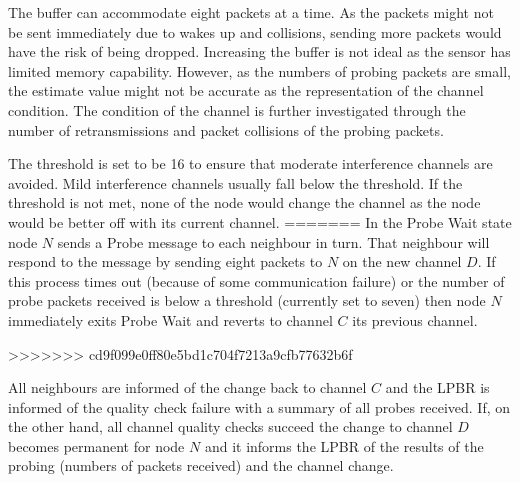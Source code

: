 The buffer can accommodate eight packets at a time. As the packets might not be sent immediately due to wakes up and collisions, sending more packets would have the risk of being dropped. Increasing the buffer is not ideal as the sensor has limited memory capability. However, as the numbers of probing packets are small, the estimate value might not be accurate as the representation of the channel condition. The condition of the channel is further investigated through the number of retransmissions and packet collisions of the probing packets. 

The threshold is set to be 16 to ensure that moderate interference channels are avoided. Mild interference channels usually fall below the threshold. If the threshold is not met, none of the node would change the channel as the node would be better off with its current channel. 
=======
In the Probe Wait state node $N$ sends a Probe message to each neighbour in turn. That neighbour will respond to the message by sending eight packets to $N$ on the new channel $D$. If this process times out (because of some communication failure) or the number of probe packets received is below a threshold (currently set to seven) then node $N$ immediately exits Probe Wait and reverts to channel $C$ its previous channel. 

>>>>>>> cd9f099e0ff80e5bd1c704f7213a9cfb77632b6f

All neighbours are informed of the change back to channel $C$ and the LPBR is informed of the quality check failure with a summary of all probes received.
If, on the other hand, all channel quality checks succeed the change to channel $D$ becomes permanent for node $N$ and it informs the LPBR of the results of the probing (numbers of packets received) and the channel change.

